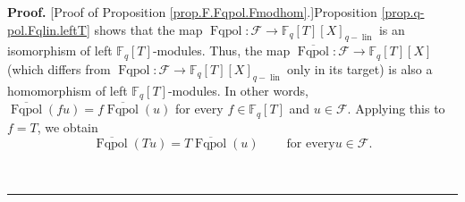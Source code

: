 \documentclass[numbers=enddot,12pt,final,onecolumn,notitlepage]{scrartcl}%
\theoremstyle{definition}
\newenvironment{proof}[1][Proof]{\noindent\textbf{#1.} }{\ \rule{0.5em}{0.5em}}
\begin{document}
\begin{proof}
[Proof of Proposition \ref{prop.F.Fqpol.Fmodhom}.]Proposition
\ref{prop.q-pol.Fqlin.leftT} shows that the map $\operatorname*{Fqpol}%
:\mathcal{F}\rightarrow\mathbb{F}_{q}\left[  T\right]  \left[  X\right]
_{q-\operatorname*{lin}}$ is an isomorphism of left $\mathbb{F}_{q}\left[
T\right]  $-modules. Thus, the map $\overline{\operatorname*{Fqpol}%
}:\mathcal{F}\rightarrow\mathbb{F}_{q}\left[  T\right]  \left[  X\right]  $
(which differs from $\operatorname*{Fqpol}:\mathcal{F}\rightarrow
\mathbb{F}_{q}\left[  T\right]  \left[  X\right]  _{q-\operatorname*{lin}}$
only in its target) is also a homomorphism of left $\mathbb{F}_{q}\left[
T\right]  $-modules. In other words, $\overline{\operatorname*{Fqpol}}\left(
fu\right)  =f\overline{\operatorname*{Fqpol}}\left(  u\right)  $ for every
$f\in\mathbb{F}_{q}\left[  T\right]  $ and $u\in\mathcal{F}$. Applying this to
$f=T$, we obtain%
\begin{equation}
\overline{\operatorname*{Fqpol}}\left(  Tu\right)  =T\overline
{\operatorname*{Fqpol}}\left(  u\right)  \ \ \ \ \ \ \ \ \ \ \text{for every
}u\in\mathcal{F}. \label{pf.prop.F.Fqpol.Fmodhom.1}%
\end{equation}



\end{proof}
\end{document}
